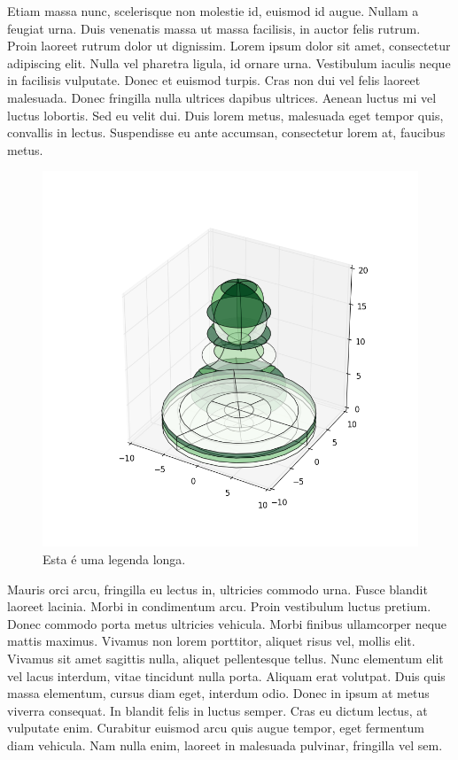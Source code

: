 \documentclass{article}
\begin{document}
	Etiam massa nunc, scelerisque non molestie id, euismod id augue. Nullam a feugiat urna. Duis venenatis massa ut massa facilisis, in auctor felis rutrum. Proin laoreet rutrum dolor ut dignissim. Lorem ipsum dolor sit amet, consectetur adipiscing elit. Nulla vel pharetra ligula, id ornare urna. Vestibulum iaculis neque in facilisis vulputate. Donec et euismod turpis. Cras non dui vel felis laoreet malesuada. Donec fringilla nulla ultrices dapibus ultrices. Aenean luctus mi vel luctus lobortis. Sed eu velit dui. Duis lorem metus, malesuada eget tempor quis, convallis in lectus. Suspendisse eu ante accumsan, consectetur lorem at, faucibus metus.
	
	\begin{figure}[H]
		\centering
		\includegraphics[width=0.7\linewidth]{figuras/figure_3}
		\caption[Leganda Curta]{Esta é uma legenda longa.}
		\label{fig:figure_3}
	\end{figure}
	
	Mauris orci arcu, fringilla eu lectus in, ultricies commodo urna. Fusce blandit laoreet lacinia. Morbi in condimentum arcu. Proin vestibulum luctus pretium. Donec commodo porta metus ultricies vehicula. Morbi finibus ullamcorper neque mattis maximus. Vivamus non lorem porttitor, aliquet risus vel, mollis elit. Vivamus sit amet sagittis nulla, aliquet pellentesque tellus. Nunc elementum elit vel lacus interdum, vitae tincidunt nulla porta. Aliquam erat volutpat. Duis quis massa elementum, cursus diam eget, interdum odio. Donec in ipsum at metus viverra consequat. In blandit felis in luctus semper. Cras eu dictum lectus, at vulputate enim. Curabitur euismod arcu quis augue tempor, eget fermentum diam vehicula. Nam nulla enim, laoreet in malesuada pulvinar, fringilla vel sem.
	
\end{document}
